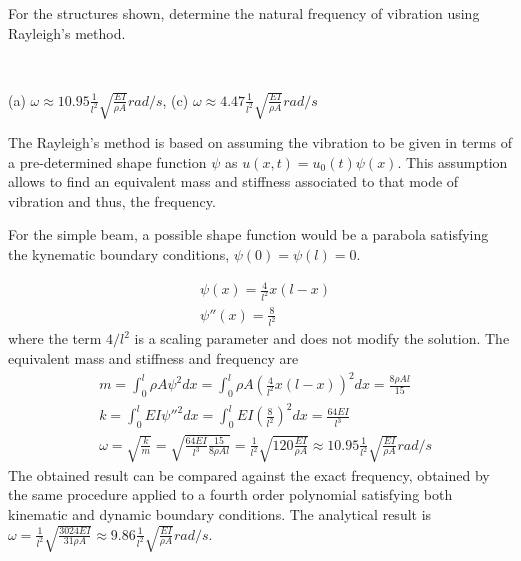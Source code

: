 
\begin{Exercise}[label={rayleigh_sdof}]
For the structures shown, determine the natural frequency of vibration using Rayleigh's method.

\begin{center}
     \\
\end{center}

\shortAnswer (a) $\omega \approx 10.95\frac{1}{l^2}\sqrt{\frac{EI}{\rho A}} rad/s$, (c) $\omega \approx 4.47\frac{1}{l^2}\sqrt{\frac{EI}{\rho A}} rad/s$
\end{Exercise}


\begin{Answer}[ref={rayleigh_sdof}]
The Rayleigh's method is based on assuming the vibration to be given in terms of a pre-determined shape function $\psi$ as $u(x,t) = u_0(t)\psi(x)$. This assumption allows to find an equivalent mass and stiffness associated to that mode of vibration and thus, the frequency.

\parbox{.7\textwidth}{For the simple beam, a possible shape function would be a parabola satisfying the kynematic boundary conditions, $\psi(0) = \psi(l) = 0$.} \hspace{1em}
\parbox{.25\textwidth}{}
\begin{align*}
&\psi(x) = \frac{4}{l^2} x (l-x) \\
&\psi''(x) = \frac{8}{l^2}
\end{align*}
where the term $4/l^2$ is a scaling parameter and does not modify the solution. The equivalent mass and stiffness and frequency are
\begin{align*}
&m = \int_0^l \rho A\psi^2dx = \int_0^l \rho A \left(\frac{4}{l^2} x (l-x)\right)^2dx = \frac{8\rho Al}{15} \\
&k = \int_0^l EI \psi''^2 dx = \int_0^l EI \left(\frac{8}{l^2}\right)^2dx = \frac{64EI}{l^3} \\
&\omega = \sqrt{\frac{k}{m}} = \sqrt{\frac{64EI}{l^3}\frac{15}{8\rho Al}} = \frac{1}{l^2}\sqrt{120\frac{EI}{\rho A}} \approx 10.95\frac{1}{l^2}\sqrt{\frac{EI}{\rho A}} rad/s
\end{align*}
The obtained result can be compared against the exact frequency, obtained by the same procedure applied to a fourth order polynomial satisfying both kinematic and dynamic boundary conditions. The analytical result is $\omega = \frac{1}{l^2}\sqrt{\frac{3024EI}{31\rho A}} \approx 9.86\frac{1}{l^2}\sqrt{\frac{EI}{\rho A}} rad/s$.


\end{Answer}
